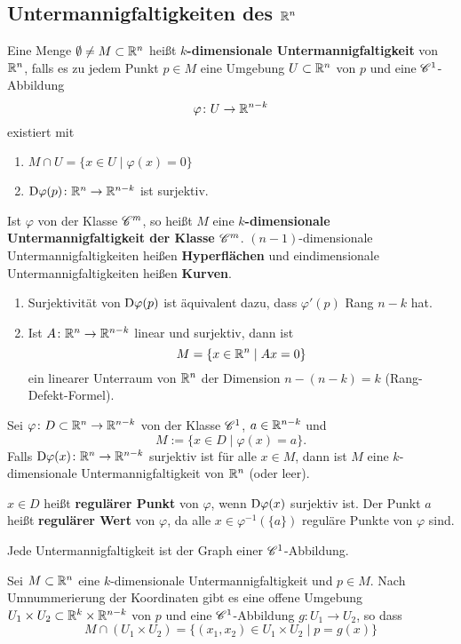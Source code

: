 \subsection{Untermannigfaltigkeiten des $\mathbb{R}^n$}
Eine Menge $\emptyset \neq M \subset \mathbb{R}^n$ heißt \textbf{$k$-dimensionale Untermannigfaltigkeit} von $\mathbb{R}^n$, falls es zu jedem Punkt $p \in M$ eine Umgebung $U \subset \mathbb{R}^n$ von $p$ und eine $\mathscr{C}^1$-Abbildung
\[\varphi \colon U \to \mathbb{R}^{n-k}\]
existiert mit
\begin{enumerate}[label=(\alph*)]
	\item $M \cap U = \{x \in U \mid \varphi(x) = 0\}$
	\item $\mathrm{D}\varphi(p) \colon \mathbb{R}^n \to \mathbb{R}^{n-k}$ ist surjektiv.
\end{enumerate}
Ist $\varphi$ von der Klasse $\mathscr{C}^m$, so heißt $M$ eine \textbf{$k$-dimensionale Untermannigfaltigkeit der Klasse $\mathscr{C}^m$}. $(n-1)$-dimensionale Untermannigfaltigkeiten heißen \textbf{Hyperflächen} und eindimensionale Untermannigfaltigkeiten heißen \textbf{Kurven}.
\begin{rem}
	\begin{enumerate}[label=(\arabic*)]
		\item Surjektivität von $\mathrm{D} \varphi(p)$ ist äquivalent dazu, dass $\varphi'(p)$ Rang $n-k$ hat.
		\item Ist $A \colon \mathbb{R}^n \to \mathbb{R}^{n-k}$ linear und surjektiv, dann ist 
		\[M = \{x \in \mathbb{R}^n \mid Ax = 0\}\]
		ein linearer Unterraum von $\mathbb{R}^n$ der Dimension $n - (n-k) = k$ (Rang-Defekt-Formel).
	\end{enumerate}
\end{rem}
\begin{thm}\label{thm1_6}
	Sei $\varphi \colon D \subset \mathbb{R}^n \to \mathbb{R}^{n-k}$ von der Klasse $\mathscr{C}^1$, $a\in \mathbb{R}^{n-k}$ und 
	\[M := \{x \in D \mid \varphi(x) = a\}.\]
	Falls $\mathrm{D}\varphi(x) \colon \mathbb{R}^n \to \mathbb{R}^{n-k}$ surjektiv ist für alle $x \in M$, dann ist $M$ eine $k$-dimensionale Untermannigfaltigkeit von $\mathbb{R}^n$ (oder leer).
\end{thm}
\begin{rem}
	$x \in D$ heißt \textbf{regulärer Punkt} von $\varphi$, wenn $\mathrm{D}\varphi(x)$ surjektiv ist. Der Punkt $a$ heißt \textbf{regulärer Wert} von $\varphi$, da alle $x \in \varphi^{-1}(\{a\})$ reguläre Punkte von $\varphi$ sind.
\end{rem}
Jede Untermannigfaltigkeit ist der Graph einer $\mathscr{C}^1$-Abbildung.
\begin{satz}\label{satz1_7}
	Sei $M \subset \mathbb{R}^n$ eine $k$-dimensionale Untermannigfaltigkeit und $p \in M$. Nach Umnummerierung der Koordinaten gibt es eine offene Umgebung $U_1 \times U_2 \subset \mathbb{R}^k \times \mathbb{R}^{n-k}$ von $p$ und eine $\mathscr{C}^1$-Abbildung $g \colon U_1 \to U_2$, so dass
	\[M \cap (U_1 \times U_2) = \{(x_1, x_2) \in U_1 \times U_2 \mid p = g(x)\}\]
\end{satz}
